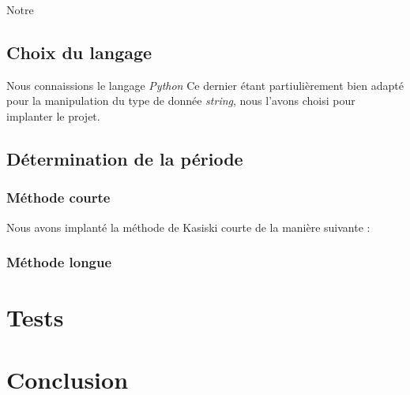 \documentclass[a4paper, 11pt]{article}
\begin{document}
Notre


\subsection{Choix du langage}
Nous connaissions le langage \textit{Python}
Ce dernier étant partiulièrement bien adapté pour la manipulation
du type de donnée \textit{string}, nous l'avons choisi pour implanter
le projet.

\subsection{Détermination de la période}
\subsubsection{Méthode courte}
Nous avons implanté la méthode de Kasiski courte de la manière
suivante : 
\subsubsection{Méthode longue}


\section{Tests}

\section{Conclusion}
\end{document}
